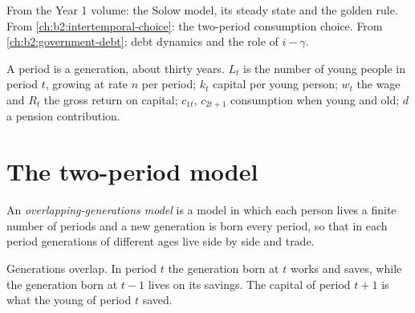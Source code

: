 \begin{recall}
From the Year 1 volume: the Solow model, its steady state and the golden rule. From \cref{ch:b2:intertemporal-choice}: the two-period
consumption choice. From \cref{ch:b2:government-debt}: debt dynamics and the role of $i - \gamma$.
\end{recall}

\begin{notation}\label{not:b2:overlapping-generations:symbols}
A period is a generation, about thirty years. $L_t$ is the number of young people in period $t$, growing at rate $n$ per period; $k_t$
capital per young person; $w_t$ the wage and $R_t$ the gross return on capital; $c_{1t}$, $c_{2t+1}$ consumption when young and old; $d$ a pension contribution.
\end{notation}

\section{The two-period model}\label{sec:b2:overlapping-generations:model}

\begin{definition}\label{def:b2:overlapping-generations:olg}
An \emph{overlapping-generations model} is a model in which each person lives a
finite number of periods and a new generation is born every period, so that in each period generations of different ages
live side by side and trade.
\end{definition}

\begin{omfigure}

{\small Generations overlap. In period $t$ the generation born at $t$ works and saves, while the generation born at $t - 1$ lives on its savings. The capital
of period $t + 1$ is what the young of period $t$ saved.}
\end{omfigure}

